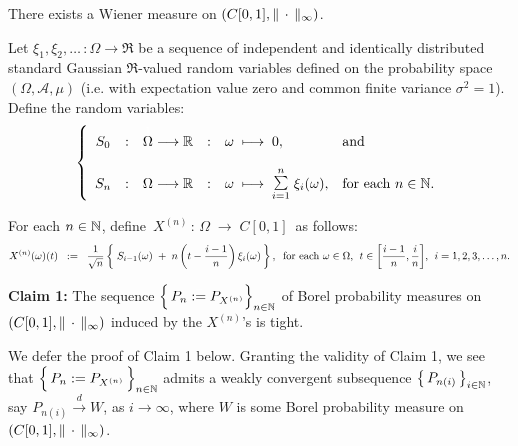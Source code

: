 \begin{theorem}
\label{WienerMeasureExistence}
\mbox{}\vskip 0.2cm
\noindent
There exists a Wiener measure on $\left(C[0,1],\Vert\,\cdot\,\Vert_{\infty}\right)$.
\end{theorem}
\proof
Let $\xi_{1}, \xi_{2}, \ldots\, : \Omega \longrightarrow \Re$ be a sequence of
independent and identically distributed standard Gaussian $\Re$-valued
random variables defined on the probability space $(\Omega,\mathcal{A},\mu)$
(i.e. with expectation value zero and common finite variance $\sigma^{2} = 1$).
Define the random variables:
\begin{equation*}
	\left\{\begin{array}{ccccll}
	S_{0}
	&:&\overset{{\color{white}1}}{\Omega} \longrightarrow \Re
	&:& \omega \;\longmapsto\; 0,
	& \textnormal{and}
	\\ \\
	S_{n}
	&:&	\Omega \longrightarrow \Re
	&:&	\omega \;\longmapsto\; \overset{n}{\underset{i=1}{\textnormal{\Large$\sum$}}}\;\xi_{i}(\omega),
	& \textnormal{for each $n \in \N$}.
	\end{array}\right.
\end{equation*}

\vskip 0.2cm
\noindent
For each $n \in \mathbb{N}$, define \,$X^{(n)} \,:\, \Omega \;\longrightarrow\;C[0,1]$\, as follows:
\begin{equation*}
	X^{(n)}(\omega)(t)
	\;\; := \;\;
	\dfrac{1}{\sqrt{n}}
	\left\{\;
	S_{i-1}(\omega) \;+\; n\left(t - \dfrac{i-1}{n}\right)\xi_{i}(\omega)
	\,\right\},
	\;\;
	\textnormal{for each $\omega \in \Omega$, \;$t \in \left[\frac{i-1}{n},\frac{i}{n}\right]$, \;$i = 1,2,3,\ldots,n$}.
\end{equation*}

\begin{center}
\begin{minipage}{6.0in}
\noindent
\textbf{Claim 1:}
\vskip 0.1cm
\noindent
The sequence
\;$\left\{\,P_{n} \overset{{\color{white}-}}{:=} P_{X^{(n)}}\right\}_{n\in\N}$\;
of Borel probability measures on
$\left(C[0,1],\Vert\,\cdot\,\Vert_{\infty}\right)$ induced by the $X^{(n)}$'s is tight.
\end{minipage}
\end{center}

\vskip 0.3cm
\noindent
We defer the proof of Claim 1 below.
Granting the validity of Claim 1, we see that
$\left\{\,P_{n} \overset{{\color{white}-}}{:=} P_{X^{(n)}}\,\right\}_{n\in\N}$\;
admits a weakly convergent subsequence $\left\{\,P_{n(i)}\,\right\}_{i\in\mathbb{N}}$,
say $P_{n(i)} \overset{d}{\longrightarrow} W$, as $i \longrightarrow \infty$,
where $W$ is some Borel probability measure
on $\left(C[0,1],\Vert\,\cdot\,\Vert_{\infty}\right)$.


